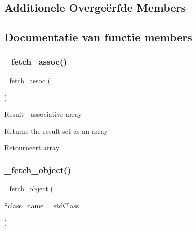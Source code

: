 \subsection*{Additionele Overge\"{e}rfde Members}


\subsection{Documentatie van functie members}
\mbox{\label{class_c_i___d_b__sqlite3__result_a43a9a92817f1334a1c10752ec44275a0}} 
\subsubsection{\texorpdfstring{\_fetch\_assoc()}{\_fetch\_assoc()}}
{\footnotesize\ttfamily \+\_\+fetch\+\_\+assoc (\begin{DoxyParamCaption}{ }\end{DoxyParamCaption})\hspace{0.3cm}{\ttfamily [protected]}}

Result -\/ associative array

Returns the result set as an array

\begin{DoxyReturn}{Retourneert}
array 
\end{DoxyReturn}
\mbox{\label{class_c_i___d_b__sqlite3__result_a60806be6a9c2488820813c2a7f4fef71}} 
\subsubsection{\texorpdfstring{\_fetch\_object()}{\_fetch\_object()}}
{\footnotesize\ttfamily \+\_\+fetch\+\_\+object (\begin{DoxyParamCaption}\item[{}]{\$class\+\_\+name = {\ttfamily \textquotesingle{}stdClass\textquotesingle{}} }\end{DoxyParamCaption})\hspace{0.3cm}{\ttfamily [protected]}}

